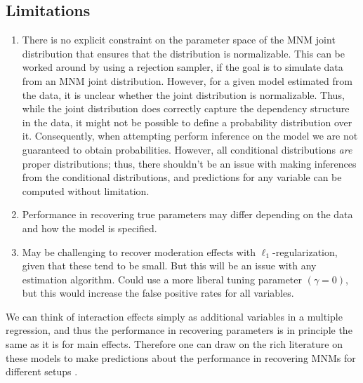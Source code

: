 \subsection{Limitations}
\begin{enumerate}
    \item There is no explicit constraint on the parameter space of the MNM joint distribution that ensures that the distribution is normalizable. This can be worked around by using a rejection sampler, if the goal is to simulate data from an MNM joint distribution. However, for a given model estimated from the data, it is unclear whether the joint distribution is normalizable. Thus, while the joint distribution does correctly capture the dependency structure in the data, it might not be possible to define a probability distribution over it. Consequently, when attempting perform inference on the model we are not guaranteed to obtain probabilities. However, all conditional distributions \textit{are} proper distributions; thus, there shouldn't be an issue with making inferences from the conditional distributions, and predictions for any variable can be computed without limitation.
    \item Performance in recovering true parameters may differ depending on the data and how the model is specified. 
    \item May be challenging to recover moderation effects with $\ell_1$-regularization, given that these tend to be small. But this will be an issue with any estimation algorithm. Could use a more liberal tuning parameter $(\gamma = 0)$, but this would increase the false positive rates for all variables.
\end{enumerate}
We can think of interaction effects simply as additional variables in a multiple regression, and thus the performance in recovering parameters is in principle the same as it is for main effects. Therefore one can draw on the rich literature on these models to make predictions about the performance in recovering MNMs for different setups \cite{hastie2015statistical,buhlmann2011statistics}.

